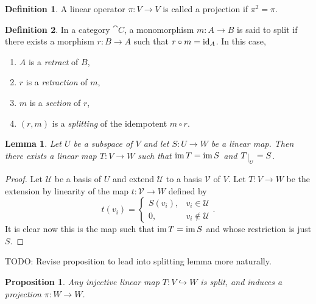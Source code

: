 \documentclass[12pt]{article}
\theoremstyle{definition}
\newtheorem{definition}{Definition}[section]
\theoremstyle{plain}
\newtheorem{proposition}[theorem] {Proposition}
\newtheorem{lemma}[theorem]{Lemma}
\numberwithin{equation}{section}
\theoremstyle{definition}
\begin{document}
\begin{definition}
A linear operator $ \pi : V \to V $ is called a projection if $\pi^2 = \pi$.
\end{definition}

\begin{definition}
In a category $ \cat{C} $,  a monomorphism $ m : A \to B $ is said to split if there exists a morphism $r: B \to A $ such that $ r \circ m = \operatorname{id}_A $. In this case, 
\begin{enumerate}
\item $ A $ is a \textit{retract} of $ B $,
\item $ r $ is a \textit{retraction} of $ m $, 
\item $ m $ is a \textit{section} of $ r $,
\item $ (r, m) $ is a \textit{splitting} of the idempotent $ m \circ r $.
\end{enumerate}
\end{definition}

\begin{lemma} \label{linear_map_extension}
Let $ U $ be a subspace of $ V $ and let $ S : U \to W $ be a linear map. Then there exists a linear map $ T : V \to W $ such that $ \operatorname{im} T = \operatorname{im} S $ and $ T\restrict{_U} = S $.
\end{lemma}

\begin{proof}
Let $ \mathscr{U} $ be a basis of $ U $ and extend $ \mathscr{U} $ to a basis $ \mathscr{V} $ of $ V $. Let $ T : V \to W $ be the extension by linearity of the map $ t : \mathscr{V} \to W $ defined by 
\[ t(v_i) = \begin{cases}
	S(v_i), & v_i \in \mathscr{U}\\
	0, & v_i \notin \mathscr{U}
\end{cases}. \]
It is clear now this is the map such that $ \operatorname{im} T = \operatorname{im} S$ and whose restriction is just $ S $.
\end{proof}

TODO: Revise proposition to lead into splitting lemma more naturally.
\begin{proposition}
Any injective linear map $ T : V \hookrightarrow W $ is split, and induces a projection $ \pi : W \to W $.
\end{proposition}
\end{document}
